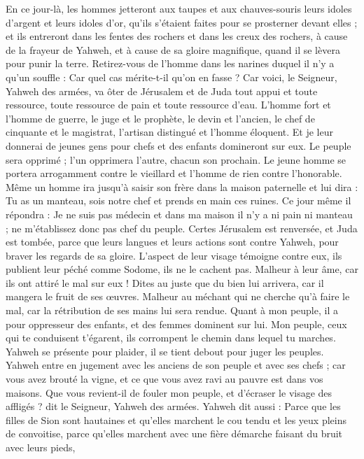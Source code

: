 \begin{multicols}{2}
En ce jour-là, les hommes jetteront aux taupes et aux chauves-souris leurs idoles d'argent et leurs idoles d'or, qu'ils s'étaient faites pour se prosterner devant elles ;
et ils entreront dans les fentes des rochers et dans les creux des rochers, à cause de la frayeur de Yahweh, et à cause de sa gloire magnifique, quand il se lèvera pour punir la terre.
Retirez-vous de l'homme dans les narines duquel il n'y a qu'un souffle : Car quel cas mérite-t-il qu'on en fasse ?
\VerseOne{}Car voici, le Seigneur, Yahweh des armées, va ôter de Jérusalem et de Juda tout appui et toute ressource, toute ressource de pain et toute ressource d'eau.
L'homme fort et l'homme de guerre, le juge et le prophète, le devin et l'ancien,
le chef de cinquante et le magistrat, l'artisan distingué et l'homme éloquent.
Et je leur donnerai de jeunes gens pour chefs et des enfants domineront sur eux.
Le peuple sera opprimé ; l'un opprimera l'autre, chacun son prochain. Le jeune homme se portera arrogamment contre le vieillard et l'homme de rien contre l'honorable.
Même un homme ira jusqu'à saisir son frère dans la maison paternelle et lui dira : Tu as un manteau, sois notre chef et prends en main ces ruines.
Ce jour même il répondra : Je ne suis pas médecin et dans ma maison il n'y a ni pain ni manteau ; ne m'établissez donc pas chef du peuple.
Certes Jérusalem est renversée, et Juda est tombée, parce que leurs langues et leurs actions sont contre Yahweh, pour braver les regards de sa gloire.
L'aspect de leur visage témoigne contre eux, ils publient leur péché comme Sodome, ils ne le cachent pas. Malheur à leur âme, car ils ont attiré le mal sur eux !
Dites au juste que du bien lui arrivera, car il mangera le fruit de ses œuvres.
Malheur au méchant qui ne cherche qu'à faire le mal, car la rétribution de ses mains lui sera rendue.
Quant à mon peuple, il a pour oppresseur des enfants, et des femmes dominent sur lui. Mon peuple, ceux qui te conduisent t'égarent, ils corrompent le chemin dans lequel tu marches.
Yahweh se présente pour plaider, il se tient debout pour juger les peuples.
Yahweh entre en jugement avec les anciens de son peuple et avec ses chefs ; car vous avez brouté la vigne, et ce que vous avez ravi au pauvre est dans vos maisons.
Que vous revient-il de fouler mon peuple, et d'écraser le visage des affligés ? dit le Seigneur, Yahweh des armées.
Yahweh dit aussi : Parce que les filles de Sion sont hautaines et qu'elles marchent le cou tendu et les yeux pleins de convoitise, parce qu'elles marchent avec une fière démarche faisant du bruit avec leurs pieds,

\end{multicols}
